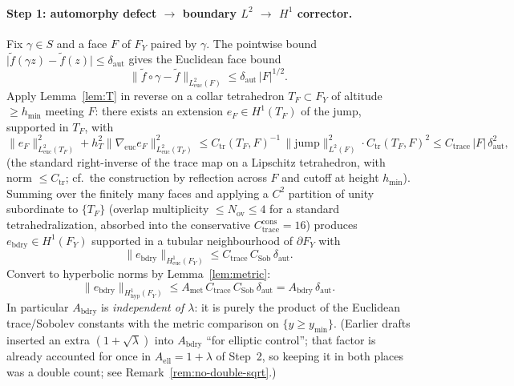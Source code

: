 \documentclass[11pt]{amsart}
\theoremstyle{definition}
\newcommand{\abs}[1]{\lvert#1\rvert}
\newcommand{\norm}[1]{\lVert#1\rVert}
\begin{document}
\paragraph{Step 1: automorphy defect $\to$ boundary $L^2$ $\to$ $H^1$ corrector.}
Fix $\gamma\in S$ and a face $F$ of $F_Y$ paired by $\gamma$.  The
pointwise bound $\abs{\widetilde f(\gamma z)-\widetilde f(z)}\le\delta_{\mathrm{aut}}$
gives the Euclidean face bound
\begin{equation}
\label{eq:step1a}
  \norm{\widetilde f\circ\gamma-\widetilde f}_{L^2_{\mathrm{euc}}(F)}
  \le
  \delta_{\mathrm{aut}}\,
  \abs{F}^{1/2}.
  \tag{1a}
\end{equation}
Apply Lemma~\ref{lem:T} in reverse on a collar tetrahedron $T_F\subset F_Y$
of altitude $\ge h_{\min}$ meeting $F$: there exists an extension
$e_F\in H^1(T_F)$ of the jump, supported in $T_F$, with
\begin{equation}
\label{eq:step1b}
  \norm{e_F}_{L^2_{\mathrm{euc}}(T_F)}^2
  +
  h_T^2\norm{\nabla_{\mathrm{euc}}e_F}_{L^2_{\mathrm{euc}}(T_F)}^2
  \le
  C_{\mathrm{tr}}(T_F,F)^{-1}\,
  \norm{\mathrm{jump}}_{L^2(F)}^2
  \cdot C_{\mathrm{tr}}(T_F,F)^{2}
  \le
  C_{\mathrm{trace}}\,
  \abs{F}\,
  \delta_{\mathrm{aut}}^2,
  \tag{1b}
\end{equation}
(the standard right-inverse of the trace map on a Lipschitz tetrahedron,
with norm $\le C_{\mathrm{tr}}$; cf.\ the construction by reflection across
$F$ and cutoff at height $h_{\min}$).  Summing over the finitely many
faces and applying a $C^2$ partition of unity subordinate to
$\{T_F\}$ (overlap multiplicity $\le N_{\mathrm{ov}}\le 4$ for a standard
tetrahedralization, absorbed into the conservative
$C_{\mathrm{trace}}^{\mathrm{cons}}=16$) produces
$e_{\mathrm{bdry}}\in H^1(F_Y)$ supported in a tubular neighbourhood of
$\partial F_Y$ with
\begin{equation}
\label{eq:step1c}
  \norm{e_{\mathrm{bdry}}}_{H^1_{\mathrm{euc}}(F_Y)}
  \le
  C_{\mathrm{trace}}\,
  C_{\mathrm{Sob}}\,
  \delta_{\mathrm{aut}}.
  \tag{1c}
\end{equation}
Convert to hyperbolic norms by Lemma~\ref{lem:metric}:
\begin{equation}
\label{eq:step1}
  \norm{e_{\mathrm{bdry}}}_{H^1_{\mathrm{hyp}}(F_Y)}
  \le
  A_{\mathrm{met}}\,
  C_{\mathrm{trace}}\,
  C_{\mathrm{Sob}}\,
  \delta_{\mathrm{aut}}
  =
  A_{\mathrm{bdry}}\,\delta_{\mathrm{aut}}.
  \tag{1}
\end{equation}
In particular $A_{\mathrm{bdry}}$ is \emph{independent of $\lambda$}: it is
purely the product of the Euclidean trace/Sobolev constants with the
metric comparison on $\{y\ge y_{\min}\}$.  (Earlier drafts inserted an
extra $(1+\sqrt{\lambda})$ into $A_{\mathrm{bdry}}$ ``for elliptic
control''; that factor is already accounted for once in
$A_{\mathrm{ell}}=1+\lambda$ of Step~2, so keeping it in both places was
a double count; see Remark~\ref{rem:no-double-sqrt}.)
\end{document}
